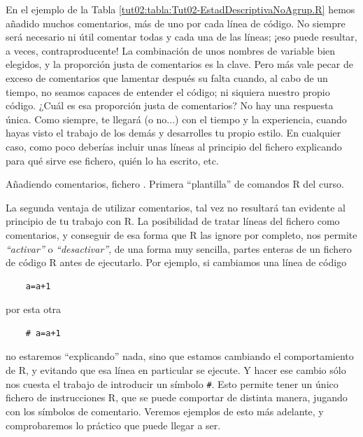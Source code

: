 \documentclass[10pt,a4paper]{article}\usepackage[]{graphicx}\usepackage[]{color}
\newcounter {cont01}
\begin{document}
En el ejemplo de la Tabla \ref{tut02:tabla:Tut02-EstadDescriptivaNoAgrup.R} hemos añadido muchos comentarios, más de uno por cada línea de código. No siempre será necesario ni útil comentar todas y cada una de las líneas; ¡eso puede resultar, a veces, contraproducente! La combinación de unos nombres de variable bien elegidos, y la proporción justa de comentarios es la clave. Pero más vale pecar de exceso de comentarios que lamentar después su falta cuando, al cabo de un tiempo, no seamos capaces de entender el código; ni siquiera nuestro propio código. ¿Cuál es esa proporción justa de comentarios? No hay una respuesta única. Como siempre,  te llegará (o no...) con el tiempo y la experiencia, cuando hayas visto el trabajo de los demás y desarrolles tu propio estilo. En cualquier caso, como poco deberías incluir unas líneas al principio del fichero explicando para qué sirve ese fichero, quién lo ha escrito, etc.\\

\begin{table}[p]
    
    \caption{Añadiendo comentarios, fichero . Primera ``plantilla'' de comandos R del curso.}
    \label{tut02:tabla:Tut02-EstadDescriptivaNoAgrup.R}
\end{table}

%

La segunda ventaja de utilizar comentarios, tal vez no resultará tan evidente al principio de tu trabajo con R. La posibilidad de tratar líneas del fichero como comentarios, y conseguir de esa forma que R las ignore por completo, nos permite {\em ``activar''} o {\em ``desactivar''}, de una forma muy sencilla, partes enteras de un fichero de código R antes de ejecutarlo. Por ejemplo, si cambiamos una línea de código
    \begin{verbatim}
    a=a+1
    \end{verbatim}
por esta otra
    \begin{verbatim}
    # a=a+1
    \end{verbatim}
no estaremos ``explicando'' nada, sino que estamos cambiando el comportamiento de R, y evitando que esa línea en particular se ejecute. Y hacer ese cambio sólo nos cuesta el trabajo de introducir un símbolo \verb&#&. Esto permite tener un único fichero de instrucciones R, que se puede comportar de distinta manera, jugando con los símbolos de comentario. Veremos ejemplos de esto más adelante, y comprobaremos lo práctico que puede llegar a ser.
\end{document}
